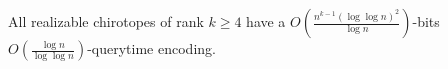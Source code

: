 \begin{contribution}[label=thm:realizable-d,restate=TheoremGPTRealizableD]
  All realizable chirotopes of rank \(k \geq 4\) have a
  \(O(\frac{n^{k-1}{(\log{\log{n}})}^2}{\log n})\)-bits
  \(O(\frac{\log{n}}{\log{\log{n}}})\)-querytime encoding.
\end{contribution}
